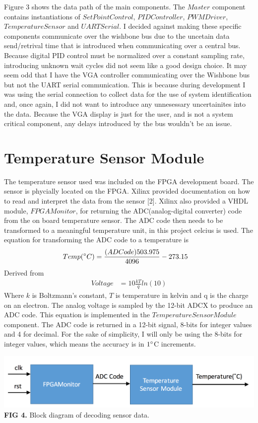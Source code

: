 \documentclass{article}
\begin{document}
Figure 3 shows the data path of the main components. The $Master$ component contains instantiations of $SetPointControl$, $PIDController$, $PWMDriver$, $TemperatureSensor$ and $UARTSerial$. I decided against making these specific components communicate over the wishbone bus due to the uncetain data send/retrival time that is introduced when communicating over a central bus. Because digital PID control must be normalized over a constant sampling rate, introducing unknown wait cycles did not seem like a good design choice. It may seem odd that I have the VGA controller communicating over the Wishbone bus but not the UART serial communication. This is because during development I was using the serial connection to collect data for the use of system identification and, once again, I did not want to introduce any unnesessary uncertainites into the data. Because the VGA display is just for the user, and is not a system critical component, any delays introduced by the bus wouldn't be an issue. 

\section{Temperature Sensor Module}
The temperature sensor used was included on the FPGA development board. The sensor is phycially located on the FPGA. Xilinx provided documentation on how to read and interpret the data from the sensor [2]. Xilinx also provided a VHDL module, $FPGAMonitor$, for returning the ADC(analog-digital converter) code from the on board temperature sensor. The ADC code then needs to be transformed to a meaningful temperature unit, in this project celcius is used. The equation for transforming the ADC code to a temperature is
\begin{align*}
Temp(\degree C) &= \frac{(ADCode)503.975}{4096}-273.15
\end{align*}
Derived from
\begin{align*}
Voltage &= 10\frac{kT}{q}ln(10)
\end{align*}
Where $k$ is Boltzmann's constant, $T$ is temperature in kelvin and q is the charge on an electron. The analog voltage is sampled by the 12-bit ADCX to produce an ADC code.
 This equation is implemented in the $TemperatureSensorModule$ component. The ADC code is returned in a 12-bit signal, 8-bits for integer values and 4 for decimal. For the sake of simplicity, I will only be using the 8-bits for integer values, which means the accuracy is in $1 \degree$C increments.
\begin{center}
\includegraphics[scale=.4]{images/sensorM}\\
\textbf{FIG 4.} Block diagram of decoding sensor data.\\
\end{center}
\end{document}
